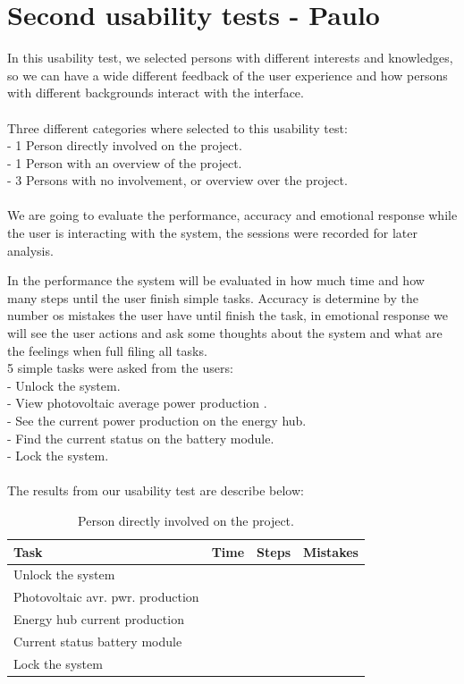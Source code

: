 \section{Second usability tests - Paulo}

In this usability test, we selected persons with different interests and knowledges, so we can have a wide different feedback of the user experience and how persons with different backgrounds interact with the interface.
\\
\\Three different categories where selected to this usability test:\\
- 1 Person directly involved on the project.\\
- 1 Person with an overview of the project.\\
- 3 Persons with no involvement, or overview over the project.\\
\\

We are going to evaluate the performance, accuracy and emotional response while the user is interacting with the system, the sessions were recorded for later analysis.

In the performance the system will be evaluated in how much time and how many steps until the user finish simple tasks. Accuracy is determine by the number os mistakes the user have until finish the task, in emotional response we will see the user actions and ask some thoughts about the system and what are the feelings when full filing all tasks.
\\
5 simple tasks were asked from the users:\\
- Unlock the system.\\
- View photovoltaic average power production .\\
- See the current power production on the energy hub.\\
- Find the current status on the battery module.\\
- Lock the system.\\
\\
The results from our usability test are describe below:

\begin{table}[!h]
\begin{tabular}{ | l | l | l | l |}
	\hline
	Task & Time & Steps & Mistakes \\ \hline
	Unlock the system & & & \\ \hline
	Photovoltaic avr. pwr. production & & & \\ \hline
	Energy hub current production & & & \\ \hline
	Current status battery module & & & \\ \hline
	Lock the system & & & \\ \hline
\end{tabular}
\caption{Person directly involved on the project.}
\end{table}

